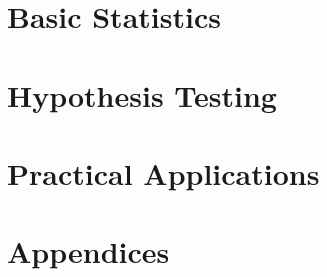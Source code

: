\documentclass[a4paper, 12pt, fleqn]{book}
\begin{document}

\maketitle
\tableofcontents
\listoffigures
\listoftables

\part{Basic Statistics} \label{Basic Statistics P}




\part{Hypothesis Testing} \label{Hypothesis Testing}




\part{Practical Applications} \label{Practical Applications}



\part{Appendices} \label{Appendices}
\appendix



\cleardoublepage
\printindex[terms]

\cleardoublepage
\printindex[people]


\end{document}
